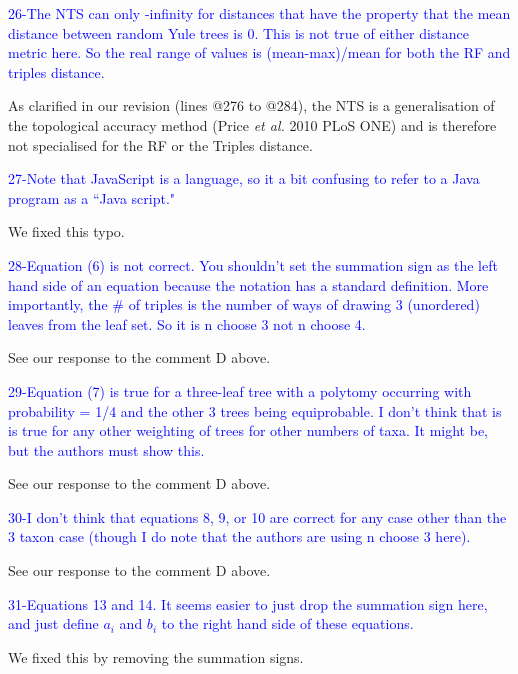 \documentclass[11pt]{letter}
\begin{document}
\begin{letter}{}
\textcolor{blue}{26-The NTS can only -infinity for distances that have the property that the mean distance between random Yule trees is 0. This is not true of either distance metric here. So the real range of values is (mean-max)/mean for both the RF and triples distance.}

As clarified in our revision (lines @276 to @284), the NTS is a generalisation of the topological accuracy method (Price \textit{et al.} 2010 PLoS ONE) and is therefore not specialised for the RF or the Triples distance.

\textcolor{blue}{27-Note that JavaScript is a language, so it a bit confusing to refer to a Java program as a ``Java script."}

We fixed this typo.

\textcolor{blue}{28-Equation (6) is not correct. You shouldn't set the summation sign as the left hand side of an equation because the notation has a standard definition. More importantly, the $\#$ of triples is the number of ways of drawing 3 (unordered) leaves from the leaf set. So it is n choose 3 not n choose 4.}

See our response to the comment D above.

\textcolor{blue}{29-Equation (7) is true for a three-leaf tree with a polytomy occurring with probability = 1/4 and the other 3 trees being equiprobable. I don't think that is is true for any other weighting of trees for other numbers of taxa. It might be, but the authors must show this.}

See our response to the comment D above.

\textcolor{blue}{30-I don't think that equations 8, 9, or 10 are correct for any case other than the 3 taxon case (though I do note that the authors are using n choose 3 here).}

See our response to the comment D above.

\textcolor{blue}{31-Equations 13 and 14. It seems easier to just drop the summation sign here, and just define $a_i$ and $b_i$ to the right hand side of these equations.}

We fixed this by removing the summation signs.


\end{letter}
\end{document}
